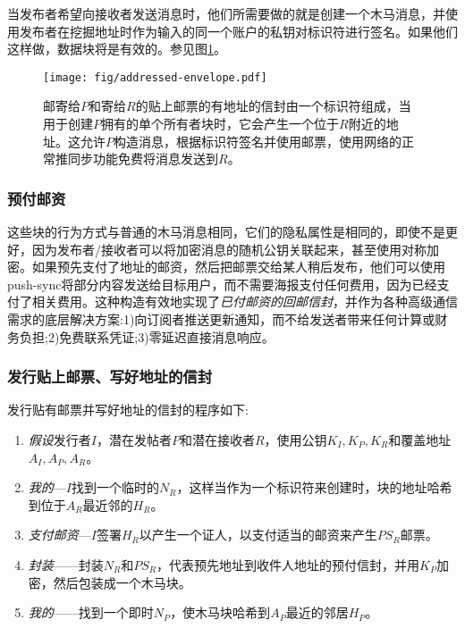 当发布者希望向接收者发送消息时，他们所需要做的就是创建一个木马消息，并使用发布者在挖掘地址时作为输入的同一个账户的私钥对标识符进行签名。如果他们这样做，数据块将是有效的。参见图\ref{fig:addressed-envelope}。


\begin{figure}[htbp]
   \centering
   \texttt{[image: fig/addressed-envelope.pdf]}
   \caption[贴有邮票和地址的信封\statusgreen]{邮寄给$P$和寄给$R$的贴上邮票的有地址的信封由一个标识符组成，当用于创建$P$拥有的单个所有者块时，它会产生一个位于$R$附近的地址。这允许$P$构造消息，根据标识符签名并使用邮票，使用网络的正常推同步功能免费将消息发送到$R$。 }
   \label{fig:addressed-envelope}
\end{figure}

\subsubsection{预付邮资}

这些块的行为方式与普通的木马消息相同，它们的隐私属性是相同的，即使不是更好，因为发布者/接收者可以将加密消息的随机公钥关联起来，甚至使用对称加密。如果预先支付了地址的邮资，然后把邮票交给某人稍后发布，他们可以使用push-sync将部分内容发送给目标用户，而不需要海报支付任何费用，因为已经支付了相关费用。这种构造有效地实现了\emph{已付邮资的回邮信封}，并作为各种高级通信需求的底层解决方案:1)向订阅者推送更新通知，而不给发送者带来任何计算或财务负担;2)免费联系凭证;3)零延迟直接消息响应。  


\subsubsection{发行贴上邮票、写好地址的信封}

发行贴有邮票并写好地址的信封的程序如下:

\begin{enumerate}
\item \emph{假设}发行者$I$，潜在发帖者$P$和潜在接收者$R$，使用公钥$K_I, K_P, K_R$和覆盖地址$A_I, A_P, A_R$。
\item \emph{我的}—$I$找到一个临时的$N_R$，这样当作为一个标识符来创建时，块的地址哈希到位于$A_R$最近邻的$H_R$。
\item \emph{支付邮资}—$I$签署$H_R$以产生一个证人，以支付适当的邮资来产生$PS_R$邮票。
\item \emph{封装}——封装$N_R$和$PS_R$，代表预先地址到收件人地址的预付信封，并用$K_P$加密，然后包装成一个木马块。
\item \emph{我的}——找到一个即时$N_P$，使木马块哈希到$A_P$最近的邻居$H_P$。 
\end{enumerate}




